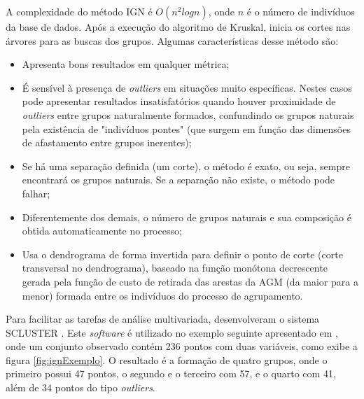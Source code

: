 A complexidade do método IGN é ${O(n^2 log n)}$, onde ${n}$ é o número de indivíduos da base de dados. Após a execução do algoritmo de Kruskal, inicia os cortes nas árvores para as buscas dos grupos.
Algumas características desse método são:
\begin{itemize}
\item Apresenta bons resultados em qualquer métrica;
\item É sensível à presença de \emph{outliers} em situações muito específicas. Nestes casos pode apresentar resultados insatisfatórios quando houver proximidade de \emph{outliers} entre grupos naturalmente formados, confundindo os grupos naturais pela existência de "indivíduos pontes" (que surgem em função das dimensões de afastamento entre grupos inerentes);
\item Se há uma separação definida (um corte), o método é exato, ou seja, sempre encontrará os grupos naturais. Se a separação não existe, o método pode falhar;
\item Diferentemente dos demais, o número de grupos naturais e sua composição é obtida automaticamente no processo;
\item Usa o dendrograma de forma invertida para definir o ponto de corte (corte transversal no dendrograma), baseado na função monótona decrescente gerada pela função de custo de retirada das arestas da AGM (da maior para a menor) formada entre os indivíduos do processo de agrupamento.
\end{itemize}

Para facilitar as tarefas de análise multivariada, \cite{ign} desenvolveram o sistema SCLUSTER \cite{scluster}. Este \textit{software} é utilizado no exemplo seguinte apresentado em \cite{devillez}, onde um conjunto observado contém 236 pontos com duas variáveis, como exibe a figura \ref{fig:ignExemplo}. O resultado é a formação de quatro grupos, onde o primeiro possui 47 pontos, o segundo e o terceiro com 57, e o quarto com 41, além de 34 pontos do tipo \textit{outliers}.

\begin{figure}[!ht]
	\centering
\end{figure}

